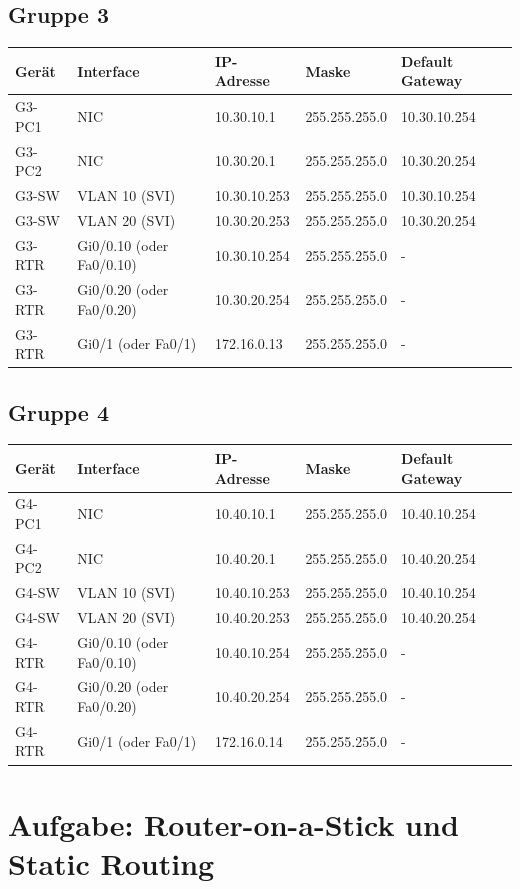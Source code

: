 \documentclass[11pt, oneside, numbers=noenddot]{scrbook}
\begin{document}
\section{Gruppe 3}
\begin{longtable}{|l|l|l|l|l|}
\hline
Gerät & Interface & IP-Adresse & Maske & Default Gateway \\
\hline
G3-PC1 & NIC & 10.30.10.1 & 255.255.255.0 & 10.30.10.254 \\
\hline
G3-PC2 & NIC & 10.30.20.1 & 255.255.255.0 & 10.30.20.254 \\
\hline
G3-SW & VLAN 10 (SVI) & 10.30.10.253 & 255.255.255.0 & 10.30.10.254 \\
\hline
G3-SW & VLAN 20 (SVI) & 10.30.20.253 & 255.255.255.0 & 10.30.20.254 \\
\hline
G3-RTR & Gi0/0.10 (oder Fa0/0.10) & 10.30.10.254 & 255.255.255.0 & - \\
\hline
G3-RTR & Gi0/0.20 (oder Fa0/0.20) & 10.30.20.254 & 255.255.255.0 & - \\
\hline
G3-RTR & Gi0/1 (oder Fa0/1) & 172.16.0.13 & 255.255.255.0 & - \\
\hline
\end{longtable}

\section{Gruppe 4}
\begin{longtable}{|l|l|l|l|l|}
\hline
Gerät & Interface & IP-Adresse & Maske & Default Gateway \\
\hline
G4-PC1 & NIC & 10.40.10.1 & 255.255.255.0 & 10.40.10.254 \\
\hline
G4-PC2 & NIC & 10.40.20.1 & 255.255.255.0 & 10.40.20.254 \\
\hline
G4-SW & VLAN 10 (SVI) & 10.40.10.253 & 255.255.255.0 & 10.40.10.254 \\
\hline
G4-SW & VLAN 20 (SVI) & 10.40.20.253 & 255.255.255.0 & 10.40.20.254 \\
\hline
G4-RTR & Gi0/0.10 (oder Fa0/0.10) & 10.40.10.254 & 255.255.255.0 & - \\
\hline
G4-RTR & Gi0/0.20 (oder Fa0/0.20) & 10.40.20.254 & 255.255.255.0 & - \\
\hline
G4-RTR & Gi0/1 (oder Fa0/1) & 172.16.0.14 & 255.255.255.0 & - \\
\hline
\end{longtable}

\chapter{Aufgabe: Router-on-a-Stick und Static Routing}
\end{document}
